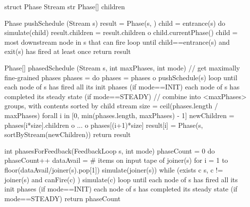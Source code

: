 struct Phase {
  Stream str
  Phase[] children
}

Phase pushSchedule (Stream s) {
  result = Phase(s, {})
  child = entrance(s)
  do {
    simulate(child)
    result.children = result.children o child.currentPhase()
    child = most downstream node in s that can fire
  } loop until child==entrance(s) and exit(s) has fired at least once
  return result
}

Phase[] phasedSchedule (Stream s, int maxPhases, int mode) {
  // get maximally fine-grained phases
  phases = {}
  do {
    phases = phases o pushSchedule(s)
  } loop until {each node of s has fired all its init phases    (if mode==INIT)
                each node of s has completed its steady state   (if mode==STEADY) }
  // combine into <maxPhases> groups, with contents sorted by child stream
  size = ceil(phases.length / maxPhases)
  forall i in [0, min(phases.length, maxPhases) - 1] {
    newChildren = phases[i*size].children o ... o phases[(i+1)*size]
    result[i] = Phase(s, sortByStream(newChildren))
  }
  return result
}

int phasesForFeedback(FeedbackLoop s, int mode) {
  phaseCount = 0
  do {
    phaseCount++
    dataAvail = # items on input tape of joiner(s)
    for i = 1 to floor(dataAvail/joiner(s).pop[1])
      simulate(joiner(s))
    while (exists c \in s, c != joiner(s) and canFire(c) )
      simulate(c)
  } loop until {each node of s has fired all its init phases    (if mode==INIT)
                each node of s has completed its steady state   (if mode==STEADY) }
  return phaseCount
}

